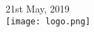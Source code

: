 \documentclass[12pt]{article}
\begin{document}
\begin{titlepage}


{\large 21st May, 2019}\\[2cm] %


\texttt{[image: logo.png]} %
 

\vfill %

\end{titlepage}
\end{document}
